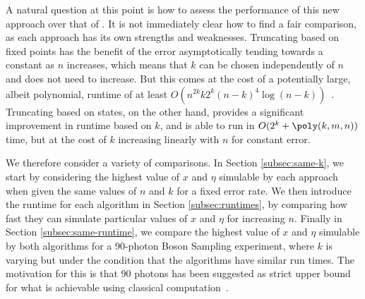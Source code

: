 A natural question at this point is how to assess the performance of this new approach over that of \cite{renema2018,renema2018loss}. 
It is not immediately clear how to find a fair comparison, as each approach has its own strengths and weaknesses. 
Truncating based on fixed points has the benefit of the error asymptotically tending towards a constant as $n$ increases, which means that $k$ can be chosen independently of $n$ and does not need to increase. 
But this comes at the cost of a potentially large, albeit polynomial, runtime of at least $O(n^{2k}k2^k(n-k)^4\log(n-k))$~\cite{renema2018,huber2008}. 
Truncating based on states, on the other hand, provides a significant improvement in runtime based on $k$, and is able to run in $O(2^k + \poly(k,m,n))$ time, but at the cost of $k$ increasing linearly with $n$ for constant error.

We therefore consider a variety of comparisons. 
In Section \ref{subsec:same-k}, we start by considering the highest value of $x$ and $\eta$ simulable by each approach when given the same values of $n$ and $k$ for a fixed error rate. 
We then introduce the runtime for each algorithm in Section \ref{subsec:runtimes}, by comparing how fast they can simulate particular values of $x$ and $\eta$ for increasing $n$. 
Finally in Section \ref{subsec:same-runtime}, we compare the highest value of $x$ and $\eta$ simulable by both algorithms for a 90-photon Boson Sampling experiment, where $k$ is varying but under the condition that the algorithms have similar run times. The motivation for this is that $90$ photons has been suggested as strict upper bound for what is achievable using classical computation~\cite{dalzell2018}.

